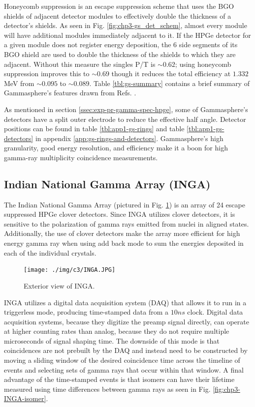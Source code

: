 Honeycomb suppression is an escape suppression scheme that uses the BGO shields of adjacent detector modules to effectively double the thickness of a detector's shields. As seen in Fig. \ref{fig:chp3-gs_det_schem}, almost every module will have additional modules immediately adjacent to it. If the HPGe detector for a given module does not register energy deposition, the 6 side segments of its BGO shield are used to double the thickness of the shields to which they are adjacent. Without this measure the singles P/T is $\sim0.62$; using honeycomb suppression improves this to $\sim0.69$ though it reduces the total efficiency at $1.332$ MeV from $\sim0.095$ to $\sim0.089$\cite{TheGS}. Table \ref{tbl:gs-summary} contains a brief summary of Gammasphere's features drawn from Refs. \cite{TheGS,SimulatedResGS,largeArrays,GSComptonSuppression}.

As mentioned in section \ref{ssec:exp-pr-gamma-spec-hpge}, some of Gammasphere's detectors have a split outer electrode to reduce the effective half angle. Detector positions can be found in table \ref{tbl:app1-gs-rings} and table \ref{tbl:app1-gs-detectors} in appendix \ref{app:gs-rings-and-detectors}. Gammasphere's high granularity, good energy resolution, and efficiency make it a boon for high gamma-ray multiplicity coincidence measurements.

\subsection{Indian National Gamma Array (INGA)}
\label{ssec:exp-pr-gamma-spec-inga}
The Indian National Gamma Array (pictured in Fig. \ref{fig:chp3-INGA}) is an array of 24 escape suppressed HPGe clover detectors\cite{ingaAtIUAC}. Since INGA utilizes clover detectors, it is sensitive to the polarization of gamma rays emitted from nuclei in aligned states\cite{cloverDet}. Additionally, the use of clover detectors make the array more efficient for high energy gamma ray when using add back mode to sum the energies deposited in each of the individual crystals.

\begin{figure}[ht!]
	\centerline{\texttt{[image: ./img/c3/INGA.JPG]}}
	\caption{Exterior view of INGA.}
	\label{fig:chp3-INGA}
\end{figure}

INGA utilizes a digital data acquisition system (DAQ) that allows it to run in a triggerless mode, producing time-stamped data from a $10ns$ clock\cite{IngaDigitalDAQ}. Digital data acquisition systems, because they digitize the preamp signal directly, can operate at higher counting rates than analog, because they do not require multiple microseconds of signal shaping time. The downside of this mode is that coincidences are not prebuilt by the DAQ and instead need to be constructed by moving a sliding window of the desired coincidence time across the timeline of events and selecting sets of gamma rays that occur within that window. A final advantage of the time-stamped events is that isomers can have their lifetime measured using time differences between gamma rays as seen in Fig. \ref{fig:chp3-INGA-isomer}.

